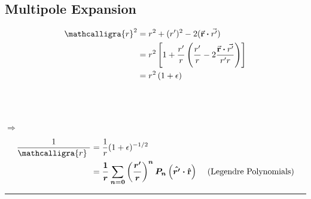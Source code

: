 \documentclass[12pt]{article}
\newcommand*{\bfr}{\mathbf{r}}
\newcommand{\scripty}[1]{\ensuremath{\mathcalligra{#1}}}
\newcommand*{\cursr}{\scripty{r}}		%
\newcommand*{\cursrr}{\scripty{r}\ }
\newcommand*{\dotP}{\boldsymbol \cdot}		%
\begin{document}
\newpage
\subsection{Multipole Expansion}
\begin{center}
\begin{minipage}[t]{0.3\textwidth}
	\begin{align*}
		\cursr^2 &= r^2 + (r')^2 - 2( \vec{\bfr} \dotP \vec{r'} ) \\
		&= r^2 \left [ 1 + \frac{r'}{r} \left ( \frac{ r' }{r} - 2\frac{ \vec{\bfr} \dotP \vec{r'} }{r'r} \right ) \right ] \\
		&= r^2 \left ( 1 + \epsilon \right )
	\end{align*}
\end{minipage}
\hspace{0\textwidth}
\begin{minipage}[t]{0.01\textwidth}
	\hfill \break \\ \\ \\
	\( \Rightarrow \)
\end{minipage}
\hspace{0\textwidth}
\begin{minipage}[t]{0.3\textwidth}
	\begin{align*}
		\frac{1}{\cursrr} &= \frac{1}{r} ( 1 + \epsilon )^{-1/2} \\
		&= \boldsymbol{ \frac{1}{r} \sum_{n=0} \left ( \frac{r'}{r} \right )^n 
			P_n \left ( \hat{r'} \dotP \hat{\bfr} \right ) }\ \ \ \ \text{(Legendre Polynomials)}
	\end{align*}	
\end{minipage}
\end{center}
\rule{0.75\paperwidth}{0.1pt}
\end{document}
